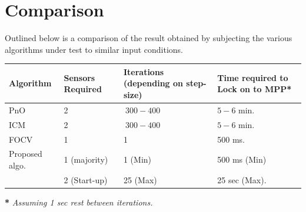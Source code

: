 \section{Comparison}
Outlined below is a comparison of the result obtained by subjecting the various algorithms under test to similar input conditions. 
\begin{center}
    \begin{tabular}{ | l | l | p{4cm} | p{4cm} |}
    \hline
    Algorithm & Sensors Required & Iterations (depending on step-size) & Time required to Lock on to MPP* \\ \hline
    \ac{PnO} & 2 & $~300 -400$ & $5-6$ min. \\ \hline
    \ac{ICM} & 2 & $~300 -400$ & $5-6$ min. \\ \hline
    \ac{FOCV} & 1 & 1 & 500 ms. \\ \hline
    Proposed algo. & 1 (majority) & 1  (Min) & 500 ms (Min)\\
    & 2 (Start-up) & 25 (Max) & 25 sec (Max).\\ \hline
   \end{tabular}
\end{center}
\textbf{*}\textit{ Assuming 1 sec rest between iterations.}


  




